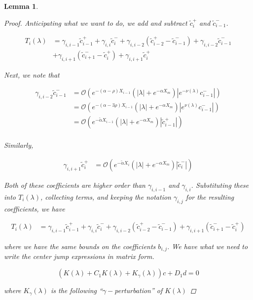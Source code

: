 \documentclass[12pt]{article}
\newtheorem{lemma}{Lemma}
\begin{document}
\begin{lemma}
\begin{proof}
Anticipating what we want to do, we add and subtract $\tilde{c}_i^+$ and $\tilde{c}_{i-1}^-$.

\begin{align*}
T_i(\lambda) &= \gamma_{i,i-1} \tilde{c}_{i-1}^+ + \gamma_{i,i} \tilde{c}_{i}^- + \gamma_{i,i-2} ( \tilde{c}_{i-2}^+ - \tilde{c}_{i-1}^-) + \gamma_{i,i-2} \tilde{c}_{i-1}^- \\
& + \gamma_{i,i+1} (\tilde{c}_{i+1}^- - \tilde{c}_i^+) + \gamma_{i,i+1} \tilde{c}_i^+
\end{align*}

Next, we note that

\begin{align*}
\gamma_{i,i-2} \tilde{c}_{i-1}^- &= \mathcal{O}(e^{-(\alpha - \rho) X_{i-1}}(|\lambda| + e^{-\alpha X_m})|e^{-\nu(\lambda)}c_{i-1}^-|) \\
&= \mathcal{O}(e^{-(\alpha - 3 \rho) X_{i-1}}(|\lambda| + e^{-\alpha X_m})|e^{\nu(\lambda)}c_{i-1}^-|) \\
&= \mathcal{O}(e^{-\tilde{\alpha} X_{i-1}}(|\lambda| + e^{-\alpha X_m})|\tilde{c}_{i-1}^+|) \\
\end{align*}

Similarly,

\begin{align*}
\gamma_{i,i+1} \tilde{c}_i^+ &= \mathcal{O}(e^{-\tilde{\alpha} X_i}(|\lambda| + e^{-\alpha X_m})|\tilde{c}_i^-|)
\end{align*}

Both of these coefficients are higher order than $\gamma_{i,i-1}$ and $\gamma_{i,i}$. Substituting these into $T_i(\lambda)$, collecting terms, and keeping the notation $\gamma_{i,j}$ for the resulting coefficients, we have

\begin{align*}
T_i(\lambda) &= \gamma_{i,i-1} \tilde{c}_{i-1}^+ + \gamma_{i,i} \tilde{c}_{i}^- + \gamma_{i,i-2} ( \tilde{c}_{i-2}^+ - \tilde{c}_{i-1}^-) + \gamma_{i,i+1} (\tilde{c}_{i+1}^- - \tilde{c}_i^+)
\end{align*}

where we have the same bounds on the coefficients $b_{i,j}$. We have what we need to write the center jump expressions in matrix form.

\[
(K(\lambda) + C_1 K(\lambda) + K_\gamma(\lambda)) c + D_1 d = 0
\]

where $K_\gamma(\lambda)$ is the following ``$\gamma-$perturbation'' of $K(\lambda)$ 


\end{proof}
\end{lemma}
\end{document}

